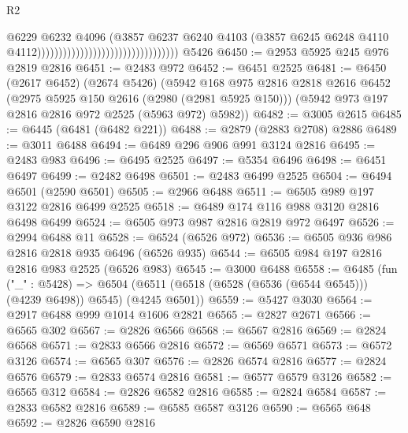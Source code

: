 \begin{lexlean}{R2}
\begin{coremodule}
                                                                  @6229
                                                                  @6232
                                                                  @4096
                                                                  (@3857
                                                                    @6237
                                                                    @6240
                                                                    @4103
                                                                    (@3857
                                                                      @6245
                                                                      @6248
                                                                      @4110
                                                                      @4112)))))))))))))))))))))))))))))))))
    @5426
@6450 := @2953 @5925 @245 @976 @2819 @2816
@6451 := @2483 @972
@6452 := @6451 @2525
@6481 := @6450
    (@2617 @6452)
    (@2674 @5426)
    (@5942
      @168
      @975
      @2816
      @2818
      @2616
      @6452
      (@2975 @5925 @150 @2616 (@2980 (@2981 @5925 @150)))
      (@5942 @973 @197 @2816 @2816 @972 @2525 (@5963 @972) @5982))
@6482 := @3005 @2615
@6485 := @6445 (@6481 (@6482 @221))
@6488 := @2879 (@2883 @2708) @2886
@6489 := @3011 @6488
@6494 := @6489 @296 @906 @991 @3124 @2816
@6495 := @2483 @983
@6496 := @6495 @2525
@6497 := @5354 @6496
@6498 := @6451 @6497
@6499 := @2482 @6498
@6501 := @2483 @6499 @2525
@6504 := @6494 @6501 (@2590 @6501)
@6505 := @2966 @6488
@6511 := @6505 @989 @197 @3122 @2816 @6499 @2525
@6518 := @6489 @174 @116 @988 @3120 @2816 @6498 @6499
@6524 := @6505 @973 @987 @2816 @2819 @972 @6497
@6526 := @2994 @6488 @11
@6528 := @6524 (@6526 @972)
@6536 := @6505 @936 @986 @2816 @2818 @935 @6496 (@6526 @935)
@6544 := @6505 @984 @197 @2816 @2816 @983 @2525 (@6526 @983)
@6545 := @3000 @6488
@6558 := @6485
    (fun ("_" : @5428) =>
    @6504 (@6511 (@6518 (@6528 (@6536 (@6544 @6545))) (@4239 @6498)) @6545) (@4245 @6501))
@6559 := @5427 @3030
@6564 := @2917 @6488 @999 @1014 @1606 @2821
@6565 := @2827 @2671
@6566 := @6565 @302
@6567 := @2826 @6566
@6568 := @6567 @2816
@6569 := @2824 @6568
@6571 := @2833 @6566 @2816
@6572 := @6569 @6571
@6573 := @6572 @3126
@6574 := @6565 @307
@6576 := @2826 @6574 @2816
@6577 := @2824 @6576
@6579 := @2833 @6574 @2816
@6581 := @6577 @6579 @3126
@6582 := @6565 @312
@6584 := @2826 @6582 @2816
@6585 := @2824 @6584
@6587 := @2833 @6582 @2816
@6589 := @6585 @6587 @3126
@6590 := @6565 @648
@6592 := @2826 @6590 @2816

\end{coremodule}
\end{lexlean}
